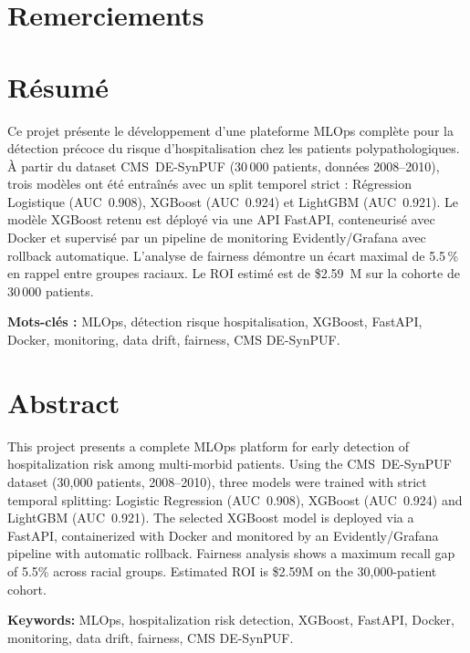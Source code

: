 \documentclass{rapportENSIAS}
\begin{document}
\fairemarges
\fairepagedegarde

\chapter*{Remerciements}


\chapter*{Résumé}
Ce projet présente le développement d'une plateforme MLOps complète pour la
détection précoce du risque d'hospitalisation chez les patients polypathologiques.
À partir du dataset CMS~DE-SynPUF (30\,000 patients, données 2008--2010), trois
modèles ont été entraînés avec un split temporel strict : Régression Logistique
(AUC~0.908), XGBoost (AUC~0.924) et LightGBM (AUC~0.921). Le modèle XGBoost
retenu est déployé via une API FastAPI, conteneurisé avec Docker et supervisé par
un pipeline de monitoring Evidently/Grafana avec rollback automatique.
L'analyse de fairness démontre un écart maximal de 5.5\,\% en rappel entre groupes
raciaux. Le ROI estimé est de \$2.59~M sur la cohorte de 30\,000 patients.

\vspace{1em}
\noindent\textbf{Mots-clés :} MLOps, détection risque hospitalisation, XGBoost,
FastAPI, Docker, monitoring, data drift, fairness, CMS DE-SynPUF.

\chapter*{Abstract}
This project presents a complete MLOps platform for early detection of
hospitalization risk among multi-morbid patients. Using the CMS~DE-SynPUF
dataset (30,000 patients, 2008--2010), three models were trained with strict
temporal splitting: Logistic Regression (AUC~0.908), XGBoost (AUC~0.924) and
LightGBM (AUC~0.921). The selected XGBoost model is deployed via a FastAPI,
containerized with Docker and monitored by an Evidently/Grafana pipeline with
automatic rollback. Fairness analysis shows a maximum recall gap of 5.5\%
across racial groups. Estimated ROI is \$2.59M on the 30,000-patient cohort.

\vspace{1em}
\noindent\textbf{Keywords:} MLOps, hospitalization risk detection, XGBoost,
FastAPI, Docker, monitoring, data drift, fairness, CMS DE-SynPUF.
\end{document}
